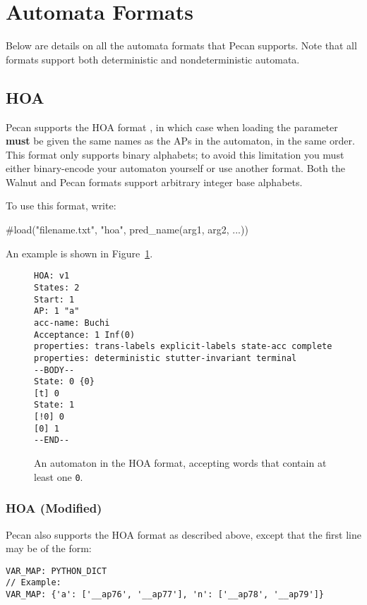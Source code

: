 \section{Automata Formats}\label{sec:aut-format}

Below are details on all the automata formats that Pecan supports.
Note that all formats support both deterministic and nondeterministic automata.

\subsection{HOA}

Pecan supports the HOA format \cite{hoa-format}, in which case when loading the parameter \textbf{must} be given the same names as the APs in the automaton, in the same order.
This format only supports binary alphabets; to avoid this limitation you must either binary-encode your automaton yourself or use another format.
Both the Walnut and Pecan formats support arbitrary integer base alphabets.

To use this format, write:
\begin{pecan}
#load("filename.txt", "hoa", pred_name(arg1, arg2, ...))
\end{pecan}

An example is shown in Figure~\ref{fig:example-hoa-aut}.
\begin{figure}
    \centering
    \begin{lstlisting}[basicstyle=\normalsize\ttfamily]
HOA: v1
States: 2
Start: 1
AP: 1 "a" 
acc-name: Buchi
Acceptance: 1 Inf(0)
properties: trans-labels explicit-labels state-acc complete
properties: deterministic stutter-invariant terminal
--BODY--
State: 0 {0} 
[t] 0
State: 1
[!0] 0
[0] 1
--END--
    \end{lstlisting}
    \caption{An automaton in the HOA format, accepting words that contain at least one \texttt{0}.}
    \label{fig:example-hoa-aut}
\end{figure}

\subsubsection{HOA (Modified)}

Pecan also supports the HOA format as described above, except that the first line may be of the form:

\begin{lstlisting}[basicstyle=\normalsize\ttfamily]
VAR_MAP: PYTHON_DICT
// Example:
VAR_MAP: {'a': ['__ap76', '__ap77'], 'n': ['__ap78', '__ap79']}
\end{lstlisting}

